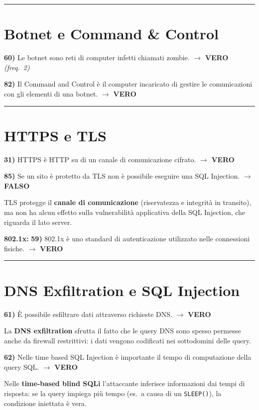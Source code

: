 \documentclass[12pt, a4paper]{report}
\newcommand{\vero}{\textcolor{verdeanswer}{\textbf{VERO}}}
\newcommand{\falso}{\textcolor{rossoanswer}{\textbf{FALSO}}}
\newcommand{\freq}[1]{\textcolor{freqcolor}{\textit{(freq.\ #1)}}}
\begin{document}
\noindent\rule{\textwidth}{0.4pt}

\section{Botnet e Command \& Control}

\noindent\textbf{60)} Le botnet sono reti di computer infetti chiamati zombie. $\to$ \vero{} \freq{2}

\medskip
\noindent\textbf{82)} Il Command and Control è il computer incaricato di gestire le comunicazioni con gli elementi di una botnet. $\to$ \vero{}

\noindent\rule{\textwidth}{0.4pt}

\section{HTTPS e TLS}

\noindent\textbf{31)} HTTPS è HTTP su di un canale di comunicazione cifrato. $\to$ \vero{}

\medskip
\noindent\textbf{85)} Se un sito è protetto da TLS non è possibile eseguire una SQL Injection. $\to$ \falso{}

\medskip
\noindent TLS protegge il \textbf{canale di comunicazione} (riservatezza e integrità in transito), ma non ha alcun effetto sulla vulnerabilità applicativa della SQL Injection, che riguarda il lato server.

\medskip
\noindent\textbf{802.1x:} \hspace{1em}\textbf{59)} 802.1x è uno standard di autenticazione utilizzato nelle connessioni fisiche. $\to$ \vero{}

\noindent\rule{\textwidth}{0.4pt}

\section{DNS Exfiltration e SQL Injection}

\noindent\textbf{61)} È possibile esfiltrare dati attraverso richieste DNS. $\to$ \vero{}

\medskip
\noindent La \textbf{DNS exfiltration} sfrutta il fatto che le query DNS sono spesso permesse anche da firewall restrittivi: i dati vengono codificati nei sottodomini delle query.

\medskip
\noindent\textbf{62)} Nelle time based SQL Injection è importante il tempo di computazione della query SQL. $\to$ \vero{}

\medskip
\noindent Nelle \textbf{time-based blind SQLi} l'attaccante inferisce informazioni dai tempi di risposta: se la query impiega più tempo (es.\ a causa di un \texttt{SLEEP()}), la condizione iniettata è vera.
\end{document}
